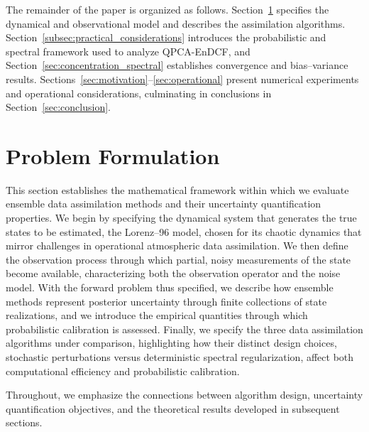 \documentclass[11pt,a4paper]{article}
\begin{document}
The remainder of the paper is organized as follows. Section~\ref{sec:problem} specifies the dynamical and observational model and describes the assimilation algorithms. Section~\ref{subsec:practical_considerations} introduces the probabilistic and spectral framework used to analyze QPCA-EnDCF, and Section~\ref{sec:concentration_spectral} establishes convergence and bias--variance results. Sections~\ref{sec:motivation}--\ref{sec:operational} present numerical experiments and operational considerations, culminating in conclusions in Section~\ref{sec:conclusion}.

\FloatBarrier







\section{Problem Formulation}\label{sec:problem}

This section establishes the mathematical framework within which we evaluate ensemble data assimilation methods and their uncertainty quantification properties. We begin by specifying the dynamical system that generates the true states to be estimated, the Lorenz–96 model, chosen for its chaotic dynamics that mirror challenges in operational atmospheric data assimilation. We then define the observation process through which partial, noisy measurements of the state become available, characterizing both the observation operator and the noise model. With the forward problem thus specified, we describe how ensemble methods represent posterior uncertainty through finite collections of state realizations, and we introduce the empirical quantities through which probabilistic calibration is assessed.
Finally, we specify the three data assimilation algorithms under comparison, highlighting how their distinct design choices, stochastic perturbations versus deterministic spectral regularization, affect both computational efficiency and probabilistic calibration.

 Throughout, we emphasize the connections between algorithm design, uncertainty quantification objectives, and the theoretical results developed in subsequent sections.
\end{document}
